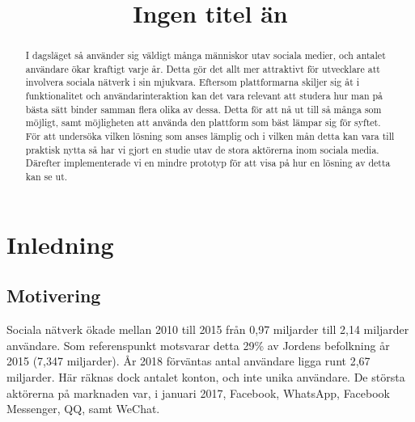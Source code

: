 \documentclass{sigchi}
\def\plaintitle{Ingen titel än}
\begin{document}
\title{\plaintitle}
\author{
}

\maketitle

\begin{abstract}
I dagsläget så använder sig väldigt många människor utav sociala medier, och antalet
användare ökar kraftigt varje år\cite{STATISTA_SN_WORLD_USERS}. Detta gör det allt mer
attraktivt för utvecklare att involvera sociala nätverk i sin mjukvara. Eftersom plattformarna
skiljer sig åt i funktionalitet och användarinteraktion kan det vara relevant att studera hur
man på bästa sätt binder samman flera olika av dessa. Detta för att nå ut till så många som
möjligt, samt möjligheten att använda den  plattform som bäst lämpar sig för syftet. För att
undersöka vilken lösning som anses lämplig och i vilken mån detta kan vara till praktisk nytta
så har vi gjort en studie utav de stora aktörerna inom sociala media. Därefter implementerade vi
en mindre prototyp för att visa på hur en lösning av detta kan se ut.
\end{abstract}

\section{Inledning}
\subsection{Motivering}
Sociala nätverk ökade mellan 2010 till 2015 från 0,97 miljarder till 2,14 miljarder användare. Som referenspunkt motsvarar detta 29\% av Jordens befolkning år 2015 (7,347 miljarder)\cite{WORLD_BANK_POPULATION}. 
År 2018 förväntas antal användare ligga runt 2,67 miljarder\cite{STATISTA_SN_WORLD_USERS}. Här räknas dock
antalet konton, och inte unika användare. De största aktörerna på marknaden var, i januari 2017, Facebook, WhatsApp, Facebook Messenger, QQ, samt WeChat\cite{STATISTA_LEADING_SOCIAL_NETWORKS}.
\end{document}

